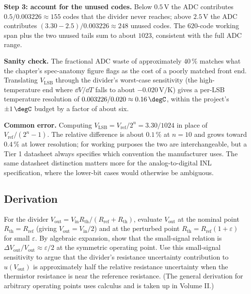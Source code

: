 \textbf{Step 3: account for the unused codes.} Below $0.5 \,\si
{\volt}$ the ADC contributes $0.5/0.003226 \approx 155$ codes
that the divider never reaches; above $2.5 \,\si{\volt}$ the
ADC contributes $(3.30 - 2.5)/0.003226 \approx 248$ unused
codes. The $620$-code working span plus the two unused tails
sum to about $1023$, consistent with the full ADC range.

\textbf{Sanity check.} The fractional ADC waste of approximately
$40\,\%$ matches what the chapter's spec-anatomy figure flags as
the cost of a poorly matched front end. Translating $V_{\text
{LSB}}$ through the divider's worst-case sensitivity (the
high-temperature end where $\dd V/\dd T$ falls to about $-0.020
\,\si{\volt\per\kelvin}$) gives a per-LSB temperature resolution
of $0.003226/0.020 \approx 0.16 \,\degC$, within the
project's $\pm 1 \,\degC$ budget by a factor of about six.

\textbf{Common error.} Computing $V_{\text{LSB}} = V_{\text{ref}}/
2^{n} = 3.30/1024$ in place of $V_{\text{ref}}/(2^{n} - 1)$. The
relative difference is about $0.1\,\%$ at $n = 10$ and grows
toward $0.4\,\%$ at lower resolution; for working purposes the
two are interchangeable, but a Tier 1 datasheet always specifies
which convention the manufacturer uses. The same datasheet
distinction matters more for the analog-to-digital INL
specification, where the lower-bit cases would otherwise be
ambiguous.

\subsection*{Derivation}

\begin{exercise}
For the divider $V_{\text{out}} = V_{\text{in}} R_{\text{th}} /
(R_{\text{ref}} + R_{\text{th}})$, evaluate $V_{\text{out}}$ at the
nominal point $R_{\text{th}} = R_{\text{ref}}$ (giving
$V_{\text{out}} = V_{\text{in}}/2$) and at the perturbed point
$R_{\text{th}} = R_{\text{ref}}(1 + \varepsilon)$ for small
$\varepsilon$. By algebraic expansion, show that the small-signal
relation is $\Delta V_{\text{out}} / V_{\text{out}} \approx
\varepsilon / 2$ at the symmetric operating point. Use this
small-signal sensitivity to argue that the divider's resistance
uncertainty contribution to $u(V_{\text{out}})$ is approximately
half the relative resistance uncertainty when the thermistor
resistance is near the reference resistance. (The general derivation
for arbitrary operating points uses calculus and is taken up in
Volume II.)
\end{exercise}

